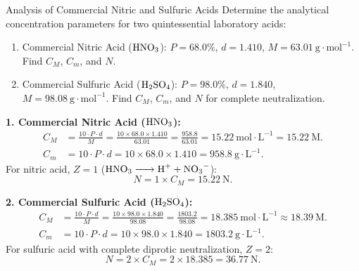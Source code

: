\begin{exercise}{Analysis of Commercial Nitric and Sulfuric Acids}
Determine the analytical concentration parameters for two quintessential laboratory acids:
\begin{enumerate}[leftmargin=1.5em,itemsep=2pt]
  \item Commercial Nitric Acid ($\ce{HNO3}$): $P = 68.0\%$, $d = 1.410$, $M = 63.01\ \mathrm{g\cdot mol^{-1}}$. Find $C_M$, $C_m$, and $N$.
  \item Commercial Sulfuric Acid ($\ce{H2SO4}$): $P = 98.0\%$, $d = 1.840$, $M = 98.08\ \mathrm{g\cdot mol^{-1}}$. Find $C_M$, $C_m$, and $N$ for complete neutralization.
\end{enumerate}
\end{exercise}

\begin{tabletworkspace}[5.0cm]
\end{tabletworkspace}

\begin{solution}
\textbf{1. Commercial Nitric Acid ($\ce{HNO3}$):}
\begin{align*}
C_M &= \frac{10 \cdot P \cdot d}{M} = \frac{10 \times 68.0 \times 1.410}{63.01} = \frac{958.8}{63.01} = \mathbf{15.22\ \mathrm{mol\cdot L^{-1}} = 15.22\ \mathrm{M}}. \\
C_m &= 10 \cdot P \cdot d = 10 \times 68.0 \times 1.410 = \mathbf{958.8\ \mathrm{g\cdot L^{-1}}}.
\end{align*}
For nitric acid, $Z = 1$ ($\ce{HNO3 -> H+ + NO3-}$):
\[
N = 1 \times C_M = \mathbf{15.22\ \mathrm{N}}.
\]

\textbf{2. Commercial Sulfuric Acid ($\ce{H2SO4}$):}
\begin{align*}
C_M &= \frac{10 \cdot P \cdot d}{M} = \frac{10 \times 98.0 \times 1.840}{98.08} = \frac{1803.2}{98.08} = \mathbf{18.385\ \mathrm{mol\cdot L^{-1}} \approx 18.39\ \mathrm{M}}. \\
C_m &= 10 \cdot P \cdot d = 10 \times 98.0 \times 1.840 = \mathbf{1803.2\ \mathrm{g\cdot L^{-1}}}.
\end{align*}
For sulfuric acid with complete diprotic neutralization, $Z = 2$:
\[
N = 2 \times C_M = 2 \times 18.385 = \mathbf{36.77\ \mathrm{N}}.
\]
\end{solution}

